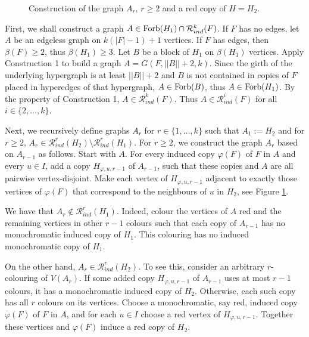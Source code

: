 \documentclass[11pt]{article}
\theoremstyle{plain}
\theoremstyle{definition}
\newcommand{\R}{\mathcal{R}}
\newcommand{\Forb}{{\rm Forb}}
\newcommand{\Rk}{\R_{ind}}
\begin{document}
\begin{figure}
\begin{center}
{}
\end{center}
\caption{Construction of the graph $A_r$, $r\geq 2$ and a red copy of $H=H_2$.}
\label{figure}
\end{figure}

 
 First, we shall construct a graph $A\in \Forb(H_1)\cap \Rk^k(F)$.
 If $F$ has no edges, let $A$ be an edgeless graph on $k(|F|-1)+1$ vertices.
 If $F$ has edges, then $\beta(F)\geq 2$, thus $\beta(H_1)\geq 3$. Let $B$ be a block of $H_1$ on $\beta(H_1)$ vertices.
 Apply Construction 1 to build a graph $A=G(F, ||B||+2, k)$.
Since the girth of the underlying hypergraph is at least $||B||+2$ and $B$ is not contained in copies of $F$ placed in hyperedges of that hypergraph,  $A\in \Forb(B)$, thus $A\in \Forb(H_1)$.   By the property of Construction 1, $A\in \Rk^k(F)$. Thus $A\in \Rk^i(F)$ for all $i\in \{2,\dots,k\}$.

Next,  we recursively define graphs  $A_r$ for $r\in \{1,\dots, k\}$ such that $A_1:=H_2$ and for $r\geq 2$, $A_{r}\in \R_{ind}^{r}(H_2) \setminus \R_{ind}^{r}(H_1)$.
For $r\geq 2$,  we construct the graph $A_r$ based on $A_{r-1}$ as follows. Start with $A$. For every induced copy $\varphi(F)$ of
$F$ in $A$ and every $u\in I$, add a  copy $H_{\varphi,u, r-1}$ of $A_{r-1}$, such that these copies and $A$ are all pairwise vertex-disjoint. 
Make each vertex of $H_{\varphi,u,r-1 }$ adjacent to exactly those vertices of  $\varphi(F)$ that  correspond to the neighbours of $u$ in $H_2$, see Figure \ref{figure}.

We have that $A_r\not\in\Rk^r(H_1)$. Indeed, colour the vertices of $A$ red and the remaining vertices in other $r-1$ colours such that each copy of $A_{r-1}$ has no monochromatic induced copy of $H_1$. This colouring has no induced monochromatic copy of $H_1$.

On the other hand, $A_r\in \Rk^r(H_2)$.  To see this, consider an arbitrary  $r$-colouring of $V(A_r)$.  If some  added copy $H_{\varphi, u, r-1}$ of $A_{r-1}$ uses  at most  $r-1$ colours, it has a monochromatic induced copy of $H_2$. Otherwise, each such copy has all $r$ colours on its vertices.  Choose a monochromatic, say red,  induced  copy $\varphi(F)$ of $F$  in $A$,  and for each $u\in I$ choose a red
vertex of $H_{\varphi,u, r-1}$. Together these vertices and $\varphi(F)$ induce a red copy of $H_2$.
\end{document}
